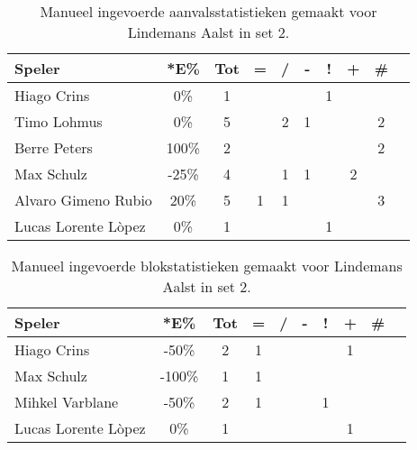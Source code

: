 \begin{table}[ht!]
    \centering
    \scriptsize
    \begin{tabular}{|l|c|c|c|c|c|c|c|c|c|}
        \hline
        \textbf{Speler} & *E\% & Tot & = & / & - & ! & + & \# \\ \hline
        Hiago Crins & 0\% & 1 &  &  &  & 1 &  & \\ 
        Timo Lohmus & 0\% & 5 &  & 2 & 1 &  & & 2 \\ 
        Berre Peters & 100\% & 2 &  &  & & & & 2 \\ 
        Max Schulz & -25\% & 4 &  & 1 & 1 &  & 2 & \\ 
        Alvaro Gimeno Rubio & 20\% & 5 & 1 & 1 &  &  &  & 3 \\ 
        Lucas Lorente Lòpez & 0\% & 1 &  &  &  & 1 &  & \\ \hline
    \end{tabular}
    \caption[Manueel ingevoerde aanvalsstatistieken gemaakt Lindemans Aalst in set 2]{\label{tab:PL3AttAalstMan2}Manueel ingevoerde aanvalsstatistieken gemaakt voor Lindemans Aalst in set 2.}
\end{table}

\begin{table}[ht!]
    \centering
    \scriptsize
    \begin{tabular}{|l|c|c|c|c|c|c|c|c|c|}
        \hline
        \textbf{Speler} & *E\% & Tot & = & / & - & ! & + & \# \\ \hline
        Hiago Crins & -50\% & 2 & 1 &  &  &  & 1 &  \\
        Max Schulz & -100\% & 1 & 1 &  &  &  &  & \\
        Mihkel Varblane & -50\% & 2 & 1 &  &  & 1 &  & \\
        Lucas Lorente Lòpez & 0\% & 1 &  &  &  &  & 1 & \\ \hline
    \end{tabular}
    \caption[Manueel ingevoerde blokstatistieken gemaakt Lindemans Aalst in set 2]{\label{tab:PL3BlockAalstMan2}Manueel ingevoerde blokstatistieken gemaakt voor Lindemans Aalst in set 2.}
\end{table}

